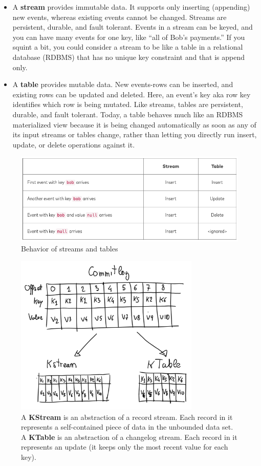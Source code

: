 \documentclass[10pt,a4paper]{article}
\begin{document}
\begin{itemize}
	\item A \textbf{stream} provides immutable data. It supports only inserting (appending) new events, whereas existing events cannot be changed. Streams are persistent, durable, and fault tolerant. Events in a stream can be keyed, and you can have many events for one key, like “all of Bob’s payments.” If you squint a bit, you could consider a stream to be like a table in a relational database (RDBMS) that has no unique key constraint and that is append only.
	\item A \textbf{table} provides mutable data. New events-rows can be inserted, and existing rows can be updated and deleted. Here, an event’s key aka row key identifies which row is being mutated. Like streams, tables are persistent, durable, and fault tolerant. Today, a table behaves much like an RDBMS materialized view because it is being changed automatically as soon as any of its input streams or tables change, rather than letting you directly run insert, update, or delete operations against it.
\end{itemize}
\begin{figure}[ht!]
 \hfill \includegraphics[width=350pt]{images/kafka-streams-vs-table}\hspace*{\fill}
 \caption{Behavior of streams and tables}
\end{figure} 
\begin{figure}[ht!]
 \hfill \includegraphics[width=250pt]{images/kafka-stream-table2}\hspace*{\fill}
 \caption{A \textbf{KStream} is an abstraction of a record stream. Each record in it represents a self-contained piece of data in the unbounded data set.
A \textbf{KTable} is an abstraction of a changelog stream. Each record in it represents an update (it keeps only the most recent value for each key).}
\end{figure} 
\end{document}
